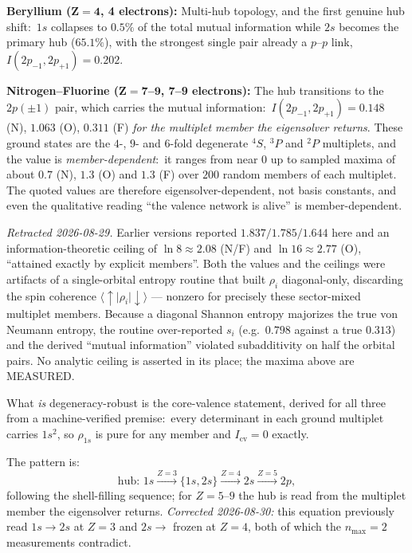\documentclass[twocolumn,pra,amsmath,amssymb,superscriptaddress]{revtex4-2}
\begin{document}
\medskip\noindent\textbf{Beryllium ($\mathbf{Z = 4}$, 4 electrons):}
Multi-hub topology, and the first genuine hub shift:\ $1s$ collapses
to $0.5\%$ of the total mutual information while $2s$ becomes the
primary hub ($65.1\%$), with the strongest single pair already a
$p$--$p$ link, $I(2p_{-1}, 2p_{+1}) = 0.202$.

\medskip\noindent\textbf{Nitrogen--Fluorine ($\mathbf{Z = 7}$--$\mathbf{9}$, 7--9 electrons):}
The hub transitions to the $2p(\pm 1)$ pair, which carries the
mutual information:\ $I(2p_{-1}, 2p_{+1}) = 0.148$ (N), $1.063$ (O),
$0.311$ (F) \emph{for the multiplet member the eigensolver returns}.
These ground states are the $4$-, $9$- and $6$-fold degenerate
${}^4S$, ${}^3P$ and ${}^2P$ multiplets, and the
value is \emph{member-dependent}:\ it ranges from near $0$ up to
sampled maxima of about $0.7$ (N), $1.3$ (O) and $1.3$ (F) over $200$
random members of each multiplet.  The quoted values are therefore
eigensolver-dependent, not basis constants, and even the qualitative
reading ``the valence network is alive'' is member-dependent.

\emph{Retracted 2026-08-29.}  Earlier versions reported
$1.837/1.785/1.644$ here and an information-theoretic ceiling of
$\ln 8 \approx 2.08$ (N/F) and $\ln 16 \approx 2.77$ (O), ``attained
exactly by explicit members''.  Both the values and the ceilings were
artifacts of a single-orbital entropy routine that built $\rho_i$
diagonal-only, discarding the spin coherence
$\langle{\uparrow}\rvert\rho_i\lvert{\downarrow}\rangle$ --- nonzero
for precisely these sector-mixed multiplet members.  Because a diagonal
Shannon entropy majorizes the true von Neumann entropy, the routine
over-reported $s_i$ (e.g.\ $0.798$ against a true $0.313$) and the
derived ``mutual information'' violated subadditivity on half the
orbital pairs.  No analytic ceiling is asserted in its place; the
maxima above are MEASURED.

What \emph{is} degeneracy-robust is the core-valence statement, derived
for all three from a machine-verified premise:\ every determinant in each ground
multiplet carries $1s^2$, so $\rho_{1s}$ is pure for any member and
$I_{\text{cv}} = 0$ exactly.

\medskip
The pattern is:
\begin{equation}
  \text{hub: } 1s \xrightarrow{Z=3} \{1s, 2s\} \xrightarrow{Z=4}
  2s \xrightarrow{Z=5} 2p,
  \label{eq:hub}
\end{equation}
following the shell-filling sequence; for $Z = 5$--$9$ the hub is read
from the multiplet member the eigensolver returns.  \emph{Corrected 2026-08-30:} this
equation previously read $1s \to 2s$ at $Z=3$ and $2s \to$ frozen at
$Z=4$, both of which the $n_{\max}=2$ measurements contradict.
\end{document}
